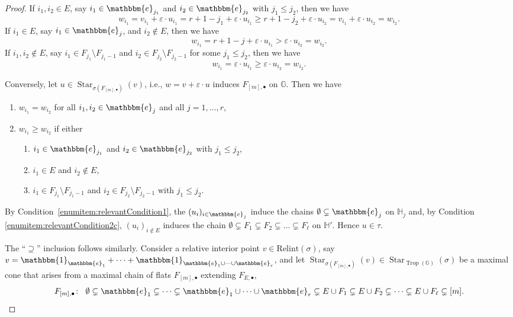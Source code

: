 \documentclass[11pt,reqno,a4paper]{amsart}
\theoremstyle{theoremstyle}
\theoremstyle{examplestyle}
\theoremstyle{algorithmstyle}
\newcommand{\ee}{\mathbbm{e}}
\newcommand{\GG}{\mathbb{G}}
\newcommand{\HH}{\mathbb{H}}
\newcommand{\bbone}{\mathbbm{1}}
\DeclareMathOperator{\Trop}{Trop}
\DeclareMathOperator{\Star}{Star}
\begin{document}
\begin{proof}
  \noindent
  If $i_1,i_2\in E$, say $i_1\in \ee_{j_1}$ and $i_2\in \ee_{j_2}$ with $j_1\leq j_2$, then we have
  \begin{equation*}
    w_{i_1}=v_{i_1}+ \varepsilon\cdot u_{i_1} = r+1-j_1+ \varepsilon\cdot u_{i_1} \geq r+1-j_2 + \varepsilon\cdot u_{i_2}= v_{i_1}+\varepsilon\cdot u_{i_2}=w_{i_2}.
  \end{equation*}
  If $i_1\in E$, say $i_1\in\ee_j$, and $i_2\notin E$, then we have
  \begin{equation*}
    w_{i_1}=r+1-j + \varepsilon\cdot u_{i_1} > \varepsilon\cdot u_{i_2} = w_{i_2}.
  \end{equation*}
  If $i_1,i_2\notin E$, say $i_1\in F_{j_1} \setminus F_{j_1-1}$ and $i_2\in F_{j_2} \setminus F_{j_2-1}$ for some $j_1\leq j_2$, then we have
  \begin{equation*}
    w_{i_1}=\varepsilon\cdot u_{i_1} \geq \varepsilon\cdot u_{i_2}=w_{i_2}.
  \end{equation*}

  Conversely, let $u\in\Star_{\sigma(F_{[m],\bullet})}(v)$, i.e., $w=v+\varepsilon\cdot u$ induces $F_{[m],\bullet}$ on $\GG$.  Then we have
  \begin{enumerate}
  \item \label{enumitem:relevantCondition1}$w_{i_1}=w_{i_2}$ for all $i_1,i_2\in \ee_j$ and all $j=1,\dots,r$,
  \item $w_{i_1}\geq w_{i_2}$ if either
    \begin{enumerate}
    \item $i_1\in \ee_{j_1}$ and $i_2\in\ee_{j_2}$ with $j_1\leq j_2$,
    \item $i_1\in E$ and $i_2\notin E$,
    \item \label{enumitem:relevantCondition2c} $i_1\in F_{j_1}\setminus F_{j_1-1}$ and $i_2\in F_{j_2}\setminus F_{j_2-1}$ with $j_1\leq j_2$.
    \end{enumerate}
  \end{enumerate}
  By Condition~\eqref{enumitem:relevantCondition1}, the $(u_i)_{i\in\ee_j}$ induce the chains $\emptyset\subsetneq \ee_j$ on $\HH_j$ and, by Condition \eqref{enumitem:relevantCondition2c}, $(u_i)_{i\notin E}$ induces the chain $\emptyset \subsetneq F_1 \subsetneq F_2\subsetneq \dots\subsetneq F_\ell$ on $\HH'$.  Hence $u\in\tau$.

  The ``$\supseteq$'' inclusion follows similarly.  Consider a relative interior point $v\in\mathrm{Relint}(\sigma)$, say $v = \bbone_{\ee_1}+\dots+\bbone_{\ee_1\cup\dots\cup\ee_r}$, and let $\Star_{\sigma(F_{[m],\bullet})}(v)\in \Star_{\Trop(\GG)}(\sigma)$ be a maximal cone that arises from a maximal chain of flats $F_{[m],\bullet}$ extending $F_{E,\bullet}$,
  \begin{equation*}
    F_{[m],\bullet}\colon\;\; \emptyset\subsetneq \ee_1\subsetneq \dots\subsetneq \ee_1\cup\dots\cup\ee_r\subsetneq E\cup F_1\subsetneq E\cup F_2\subsetneq\dots\subsetneq E\cup F_\ell\subsetneq [m].
  \end{equation*}


\end{proof}
\end{document}
